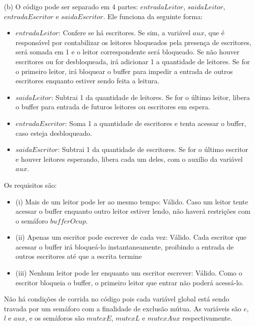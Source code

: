 \documentclass{homework}
\begin{document}
(b) O código pode ser separado em 4 partes: $entradaLeitor$, $saidaLeitor$, $entradaEscritor$ e $saidaEscritor$. Ele funciona da seguinte forma:
\begin{itemize}
    \item $entradaLeitor$: Confere se há escritores. Se sim, a variável $aux$, que é responsável por contabilizar os leitores bloqueados pela presença de escritores, será somada em 1 e o leitor correspondente será bloqueado. Se não houver escritores ou for desbloqueada, irá adicionar 1 a quantidade de leitores. Se for o primeiro leitor, irá bloquear o buffer para impedir a entrada de outros escritores enquanto estiver sendo feita a leitura.
    \item $saidaLeitor$: Subtrai 1 da quantidade de leitores. Se for o último leitor, libera o buffer para entrada de futuros leitores ou escritores em espera.
    \item $entradaEscritor$: Soma 1 a quantidade de escritores e tenta acessar o buffer, caso esteja desbloqueado.
    \item $saidaEscritor$: Subtrai 1 da quantidade de escritores. Se for o último escritor e houver leitores esperando, libera cada um deles, com o auxílio da variável $aux$.
\end{itemize}

Os requisitos são:
\begin{itemize}
    \item (i) Mais de um leitor pode ler ao mesmo tempo: Válido. Caso um leitor tente acessar o buffer enquanto outro leitor estiver lendo, não haverá restrições com o semáforo $bufferOcup$.
    \item (ii) Apenas um escritor pode escrever de cada vez: Válido. Cada escritor que acessar o buffer irá bloqueá-lo instantaneamente, proibindo a entrada de outros escritores até que a escrita termine
    \item (iii) Nenhum leitor pode ler enquanto um escritor escrever: Válido. Como o escritor bloqueia o buffer, o primeiro leitor que entrar não poderá acessá-lo.
\end{itemize}

Não há condições de corrida no código pois cada variável global está sendo travada por um semáforo com a finalidade de exclusão mútua. As variáveis são $e$, $l$ e $aux$, e os semáforos são $mutexE$, $mutexL$ e $mutexAux$ respectivamente.
\end{document}
